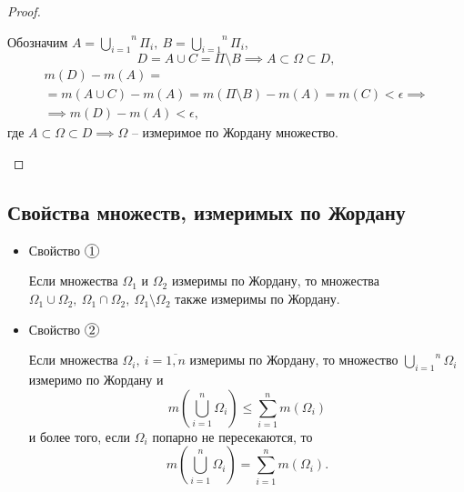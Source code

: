 \begin{proof}
\begin{itemize}
              Обозначим $ A = \overset{n}{\underset{i=1}{\bigcup}}\Pi_i, \ B = \overset{n}{\underset{i=1}{\bigcup}} \Pi_i $,
              \[
                  D = A \cup C = \Pi \setminus B \implies A \subset \Omega \subset D,
              \]
              \begin{multline*}
                  m(D) - m(A) = \\
                  = m(A \cup C) - m(A) = m(\Pi\setminus B) - m(A) = m(C) < \epsilon \implies \\
                  \implies m(D) - m(A) < \epsilon,
              \end{multline*}
              где $ A \subset \Omega \subset D \implies \Omega $ -- измеримое по Жордану множество.
    \end{itemize}
\end{proof}

\subsection{Свойства множеств, измеримых по Жордану}

\begin{itemize}
    \item Свойство $ \circled{1} $
          \begin{statement}
              Если множества $ \Omega_1 $ и $ \Omega_2 $ измеримы по Жордану, то множества $ \Omega_1 \cup \Omega_2, \ \Omega_1 \cap \Omega_2, \ \Omega_1 \setminus \Omega_2 $ также измеримы по Жордану.
          \end{statement}

          \newpage

    \item Свойство $ \circled{2} $
          \begin{statement}
              Если множества $ \Omega_i, \ i = \overline{1,n} $ измеримы по Жордану, то множество $ \overset{n}{\underset{i=1}{\bigcup}}\Omega_i $ измеримо по Жордану и
              \[
                  m\left(\overset{n}{\underset{i=1}{\bigcup}}\Omega_i\right) \leqslant \sum_{i=1}^{n}m(\Omega_i)
              \]
              и более того, если $ \Omega_i $ попарно не пересекаются, то
              \[
                  m\left(\overset{n}{\underset{i=1}{\bigcup}}\Omega_i\right) = \sum_{i=1}^{n}m(\Omega_i).
              \]
          \end{statement}
\end{itemize}